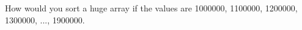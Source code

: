   How would you sort a huge array if the values are
  1000000, 1100000, 1200000, 1300000, ..., 1900000.
